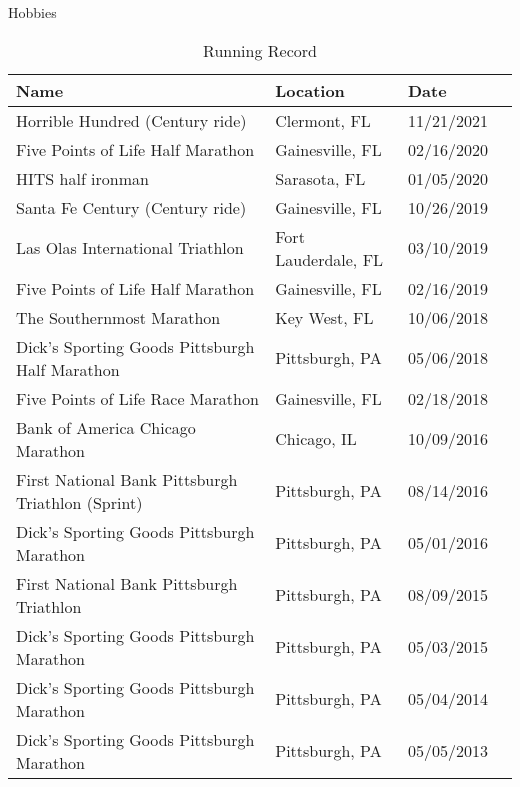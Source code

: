 \documentclass{resume} %
\begin{document}
\begin{rSection}{Hobbies}
\begin{table}[htp]
\caption*{Running Record}
\begin{center}
\begin{tabular}{l l l l}
\hline
\hline
Name & Location  & Date \\
\hline
Horrible Hundred (Century ride) & Clermont, FL &  {11/21/2021} \\
Five Points of Life Half Marathon & Gainesville, FL &  {02/16/2020} \\
HITS half ironman & Sarasota, FL & 01/05/2020 \\
Santa Fe Century (Century ride)  & Gainesville, FL & 10/26/2019 \\
Las Olas International Triathlon & Fort Lauderdale, FL &  {03/10/2019} \\
Five Points of Life Half Marathon & Gainesville, FL &  {02/16/2019} \\
The Southernmost Marathon & Key West, FL &  {10/06/2018}\\
Dick's Sporting Goods Pittsburgh Half Marathon & Pittsburgh, PA &  {05/06/2018}\\
Five Points of Life Race Marathon & Gainesville, FL&   {02/18/2018}\\
Bank of America Chicago Marathon & Chicago, IL&   {10/09/2016}\\
First National Bank Pittsburgh Triathlon (Sprint) & Pittsburgh, PA &   {08/14/2016}\\
Dick's Sporting Goods Pittsburgh Marathon & Pittsburgh, PA&   {05/01/2016} \\
First National Bank Pittsburgh Triathlon & Pittsburgh, PA &  {08/09/2015}\\
Dick's Sporting Goods Pittsburgh Marathon & {Pittsburgh, PA} &  {05/03/2015}\\
Dick's Sporting Goods Pittsburgh Marathon & {Pittsburgh, PA} &    {{05/04/2014}}\\
Dick's Sporting Goods Pittsburgh Marathon & {Pittsburgh, PA} &   {05/05/2013}\\
\hline
\hline
\end{tabular}
\end{center}
\label{default}
\end{table}%


\end{rSection}






\end{document}
